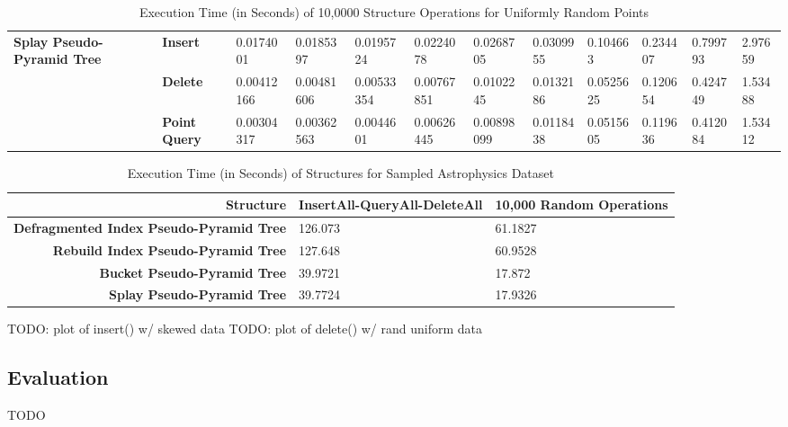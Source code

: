 \begin{landscape}
\begin{table}
\begin{tabular}{|p{2cm}|l|l|l|l|l|l|l|l|l|l|l|}
			\multirow{ 4}{*}{\textbf{Splay Pseudo-Pyramid Tree}} & \textbf{Insert} & 0.0174001 & 0.0185397 & 0.0195724 & 0.0224078 & 0.0268705 & 0.0309955 & 0.104663 & 0.234407 & 0.799793 & 2.97659 \\
			 & \textbf{Delete} & 0.00412166 & 0.00481606 & 0.00533354 & 0.00767851 & 0.0102245 & 0.0132186 & 0.0525625 & 0.120654 & 0.424749 & 1.53488  \\
			 & \textbf{Point Query} & 0.00304317 & 0.00362563 & 0.0044601 & 0.00626445 & 0.00898099 & 0.0118438 & 0.0515605 & 0.119636 & 0.412084 & 1.53412 \\
			\hline
		\end{tabular}
		\caption{Execution Time (in Seconds) of 10,0000 Structure Operations for Uniformly Random Points}
		\label{tab:perf2-randuniform}
	\end{table}

	\begin{table}
		\centering
		\begin{tabular}{|r|l|l|}
			\hline
			\textbf{Structure} & \textbf{InsertAll-QueryAll-DeleteAll} & \textbf{10,000 Random Operations} \\
			\hline
			\textbf{Defragmented Index Pseudo-Pyramid Tree} & 126.073 & 61.1827 \\
			\textbf{Rebuild Index Pseudo-Pyramid Tree} & 127.648 & 60.9528 \\
			\textbf{Bucket Pseudo-Pyramid Tree} & 39.9721 & 17.872 \\
			\textbf{Splay Pseudo-Pyramid Tree} & 39.7724 & 17.9326 \\
			\hline
		\end{tabular}
		\caption{Execution Time (in Seconds) of Structures for Sampled Astrophysics Dataset}
		\label{tab:perf2-astrophysics}
	\end{table}

\end{landscape}

TODO: plot of insert() w/ skewed data
TODO: plot of delete() w/ rand uniform data

\subsection{Evaluation}

TODO
